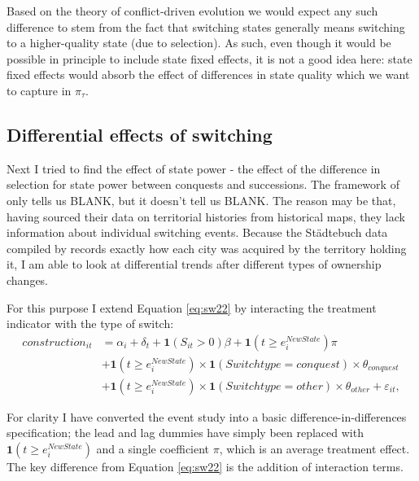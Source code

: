 \documentclass[11pt, a4paper]{article}
\begin{document}

Based on the theory of conflict-driven evolution we would expect any such difference to stem from the fact that switching states generally means switching to a higher-quality state (due to selection). As such, even though it would be possible in principle to include state fixed effects, it is not a good idea here: state fixed effects would absorb the effect of differences in state quality which we want to capture in $\pi_\tau$. 


\subsection{Differential effects of switching}

Next I tried to find the effect of state power - the effect of the difference in selection for state power between conquests and successions. The framework of \cite{schoenholzer2022} only tells us BLANK, but it doesn't tell us BLANK. The reason may be that, having sourced their data on territorial histories from historical maps, they lack information about individual switching events. Because the Städtebuch data compiled by \cite{pt2} records exactly how each city was acquired by the territory holding it, I am able to look at differential trends after different types of ownership changes.

For this purpose I extend Equation \eqref{eq:sw22} by interacting the treatment indicator with the type of switch:
\begin{equation}
\label{eq:baseline}
\begin{split}
    construction_{it} &= \alpha_i + \delta_t + \mathbf{1}(S_{it} > 0)\beta +
    \mathbf{1}(t \ge e^{NewState}_i)\pi \\
    &+ \mathbf{1}(t \ge e^{NewState}_i) \times
    \mathbf{1}(Switchtype = conquest) \times \theta_{conquest} \\
    &+ \mathbf{1}(t \ge e^{NewState}_i) \times
    \mathbf{1}(Switchtype = other) \times \theta_{other} + \varepsilon_{it},
\end{split}
\end{equation}

For clarity I have converted the event study into a basic difference-in-differences specification; the lead and lag dummies have simply been replaced with $\mathbf{1}(t \ge e^{NewState}_i)$ and a single coefficient $\pi$, which is an average treatment effect. The key difference from Equation \eqref{eq:sw22} is the addition of interaction terms. 
\end{document}
